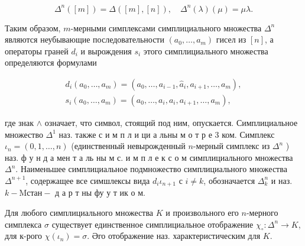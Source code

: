 \documentclass[10pt]{article}
\begin{document}
\[

\Delta^{n}([m])=\Delta([m],[n]), \quad \Delta^{n}(\lambda)(\mu)=\mu \lambda .

\]



Таким образом, $m$-мерными симплексами симплициального множества $\Delta^{n}$ являются неубывающие последовательности $\left(a_{0}, \ldots, a_{m}\right)$ гисел из $[n]$, а операторы граней $d_{i}$ и вырождения $s_{i}$ этого симплициального множества определяются формулами



\[

\begin{gathered}

d_{i}\left(a_{0}, \ldots, a_{m}\right)=\left(a_{0}, \ldots, a_{i-1}, \hat{a}_{i}, a_{i+1}, \ldots, a_{m}\right), \\

s_{i}\left(a_{0}, \ldots, a_{m}\right)=\left(a_{0}, \ldots, a_{i}, a_{i}, a_{i+1}, \ldots, a_{m}\right),

\end{gathered}

\]



где знак $\wedge$ означает, что символ, стоящий под ним, опускается. Симплициальное множество $\Delta^{1}$ наз. также с и м п л и ци а льны м о т р е 3 ком. Симплекс $\iota_{n}=(0,1, \ldots, n)$ (единственный невырожденный $n$-мерный симплекс из $\Delta^{n}$ ) наз. ф у н д а мен т а ль ны м с. и м п л е к с о м симплициального множества $\Delta^{n}$. Наименьшее симплициальное подмножество симплициального множества $\Delta^{n+1}$, содержащее все симшлексы вида $d_{i} \iota_{n+1}$ с $i \neq k$, обозначается $\Delta_{k}^{n}$ и наз. $k-\mathrm{M} \mathrm{с} \mathrm{т} \mathrm{а} \mathrm{н-}$ д а р т ны фу у т ик о м.



Для любого симплициального множества $K$ и произвольного его $n$-мерного симплекса $\sigma$ существует единственное симплициальное отображение $\chi_{\circ}: \Delta^{n} \rightarrow K$, для к-рого $\chi\left(\iota_{n}\right)=\sigma$. Әго отображение наз. характеристическим для $K$.
\end{document}

